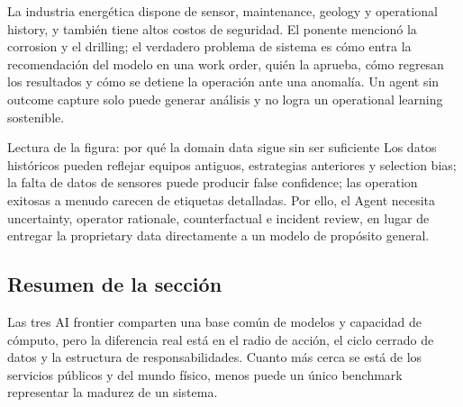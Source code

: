 La industria energética dispone de sensor, maintenance, geology y operational history, y también tiene altos costos de seguridad. El ponente mencionó la corrosion y el drilling; el verdadero problema de sistema es cómo entra la recomendación del modelo en una work order, quién la aprueba, cómo regresan los resultados y cómo se detiene la operación ante una anomalía. Un agent sin outcome capture solo puede generar análisis y no logra un operational learning sostenible.


\begin{knowledgebox}{Lectura de la figura: por qué la domain data sigue sin ser suficiente}
Los datos históricos pueden reflejar equipos antiguos, estrategias anteriores y selection bias; la falta de datos de sensores puede producir false confidence; las operation exitosas a menudo carecen de etiquetas detalladas. Por ello, el Agent necesita uncertainty, operator rationale, counterfactual e incident review, en lugar de entregar la proprietary data directamente a un modelo de propósito general.
\end{knowledgebox}


\subsection{Resumen de la sección}

Las tres AI frontier comparten una base común de modelos y capacidad de cómputo, pero la diferencia real está en el radio de acción, el ciclo cerrado de datos y la estructura de responsabilidades. Cuanto más cerca se está de los servicios públicos y del mundo físico, menos puede un único benchmark representar la madurez de un sistema.
